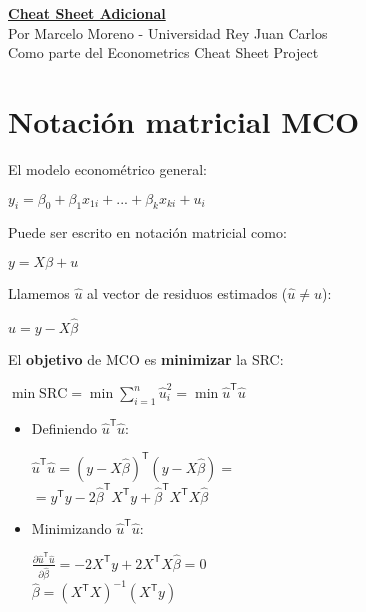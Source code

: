 \documentclass[10pt, a4paper, landscape]{extarticle}
\newcommand{\SRC}{\mathrm{SRC}}
\newcommand{\tr}{\mathsf{T}}
\begin{document}
\setlength{\footskip}{12pt}

\begin{multicols}{3} %
\begin{center}
	\textbf{\LARGE \href{https://github.com/marcelomijas/econometrics-cheatsheet}{Cheat Sheet Adicional}} \\
	{\footnotesize Por Marcelo Moreno - Universidad Rey Juan Carlos} \\
	{\footnotesize Como parte del Econometrics Cheat Sheet Project}
\end{center}
\section*{Notación matricial MCO}
	El modelo econométrico general:
	\begin{center}
		$y_i = \beta_0 + \beta_1 x_{1i} + ... + \beta_k x_{ki} + u_i$
	\end{center}
	Puede ser escrito en notación matricial como:
	\begin{center}
		$y = X \beta + u$
	\end{center}
	Llamemos $\hat{u}$ al vector de residuos estimados ($\hat{u} \neq u$):
	\begin{center}
		$\hat{u} = y - X \hat{\beta}$
	\end{center}
	El \textbf{objetivo} de MCO es \textbf{minimizar} la SRC:
	\begin{center}
		$\min \SRC = \min \sum_{i=1}^n \hat{u}_i^2 = \min \hat{u}^\tr \hat{u}$
	\end{center}
	\begin{itemize}[leftmargin=*]
		\item Definiendo $\hat{u}^\tr \hat{u}$:
		\begin{center}
			$\hat{u}^\tr \hat{u} = (y - X \hat{\beta})^\tr (y - X \hat{\beta}) =$ \\
			$= y^\tr y -2 \hat{\beta}^\tr X^\tr y + \hat{\beta}^\tr X^\tr X \hat{\beta}$
		\end{center}
		\item Minimizando $\hat{u}^\tr \hat{u}$:
		\begin{center}
			$\frac{\partial \hat{u}^\tr \hat{u}}{\partial \hat{\beta}} = -2 X^\tr y +2 X^\tr X \hat{\beta} = 0$ \\
			$\hat{\beta} = (X^\tr X)^{-1} (X^\tr y)$ \\

\end{center}
\end{itemize}
\end{multicols}
\end{document}
